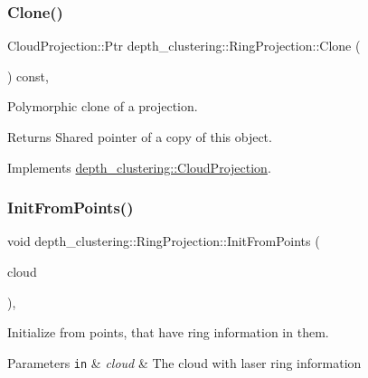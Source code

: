 \subsubsection{\texorpdfstring{Clone()}{Clone()}}
{\footnotesize\ttfamily Cloud\+Projection\+::\+Ptr depth\+\_\+clustering\+::\+Ring\+Projection\+::\+Clone (\begin{DoxyParamCaption}{ }\end{DoxyParamCaption}) const\hspace{0.3cm}{\ttfamily [override]}, {\ttfamily [virtual]}}



Polymorphic clone of a projection. 

\begin{DoxyReturn}{Returns}
Shared pointer of a copy of this object. 
\end{DoxyReturn}


Implements \hyperlink{classdepth__clustering_1_1CloudProjection_ae06ff9699c1a37c535b39fa6f722fa2e}{depth\+\_\+clustering\+::\+Cloud\+Projection}.

\mbox{\label{classdepth__clustering_1_1RingProjection_acfda4cfe9a0b80936987691fe44fc79c}} 
\subsubsection{\texorpdfstring{Init\+From\+Points()}{InitFromPoints()}}
{\footnotesize\ttfamily void depth\+\_\+clustering\+::\+Ring\+Projection\+::\+Init\+From\+Points (\begin{DoxyParamCaption}\item[{const Rich\+Point\+::\+Aligned\+Vector \&}]{cloud }\end{DoxyParamCaption})\hspace{0.3cm}{\ttfamily [override]}, {\ttfamily [virtual]}}



Initialize from points, that have ring information in them. 


\begin{DoxyParams}[1]{Parameters}
\mbox{\tt in}  & {\em cloud} & The cloud with laser ring information \\
\hline
\end{DoxyParams}


